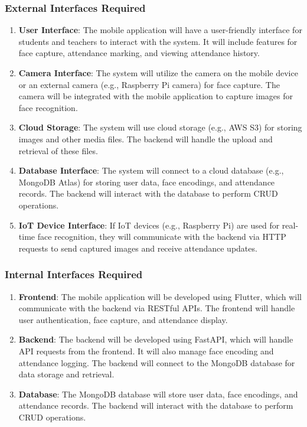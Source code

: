 \documentclass[openany]{report}
\begin{document}
\subsubsection{External Interfaces Required}
\begin{enumerate}
    \item \textbf{User Interface}: The mobile application will have a user-friendly interface for students and teachers to interact with the system. It will include features for face capture, attendance marking, and viewing attendance history.
    \item \textbf{Camera Interface}: The system will utilize the camera on the mobile device or an external camera (e.g., Raspberry Pi camera) for face capture. The camera will be integrated with the mobile application to capture images for face recognition.
    \item \textbf{Cloud Storage}: The system will use cloud storage (e.g., AWS S3) for storing images and other media files. The backend will handle the upload and retrieval of these files.
    \item \textbf{Database Interface}: The system will connect to a cloud database (e.g., MongoDB Atlas) for storing user data, face encodings, and attendance records. The backend will interact with the database to perform CRUD operations.
    \item \textbf{IoT Device Interface}: If IoT devices (e.g., Raspberry Pi) are used for real-time face recognition, they will communicate with the backend via HTTP requests to send captured images and receive attendance updates.
\end{enumerate}
\subsubsection{Internal Interfaces Required}
\begin{enumerate}
    \item \textbf{Frontend}: The mobile application will be developed using Flutter, which will communicate with the backend via RESTful APIs. The frontend will handle user authentication, face capture, and attendance display.
    \item \textbf{Backend}: The backend will be developed using FastAPI, which will handle API requests from the frontend. It will also manage face encoding and attendance logging. The backend will connect to the MongoDB database for data storage and retrieval.
    \item \textbf{Database}: The MongoDB database will store user data, face encodings, and attendance records. The backend will interact with the database to perform CRUD operations.
\end{enumerate}
\end{document}
